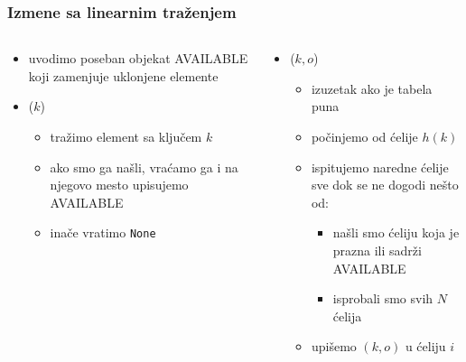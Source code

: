 \documentclass[compress]{beamer}
\begin{document}
\begin{frame}[fragile]
  \frametitle{Izmene sa linearnim traženjem}
  \begin{columns}
    \begin{column}[c]{6cm}
      \begin{itemize}
        \item uvodimo poseban objekat {\tiny AVAILABLE} koji zamenjuje uklonjene elemente
        \item {}($k$)
        \begin{itemize}
          \item tražimo element sa ključem $k$
          \item ako smo ga našli, vraćamo ga i na njegovo mesto upisujemo {\tiny AVAILABLE}
          \item inače vratimo \texttt{None}
        \end{itemize}
      \end{itemize}
    \end{column}
    \begin{column}[c]{6cm}
      \begin{itemize}
        \item {}($k, o$)
        \begin{itemize}
          \item izuzetak ako je tabela puna
          \item počinjemo od ćelije $h(k)$
          \item ispitujemo naredne ćelije sve dok se ne dogodi nešto od:
          \begin{itemize}
            \item našli smo ćeliju koja je prazna ili sadrži {\tiny AVAILABLE}
            \item isprobali smo svih $N$ ćelija
          \end{itemize}
          \item upišemo $(k, o)$ u ćeliju $i$
        \end{itemize}
      \end{itemize}
    \end{column}
  \end{columns}
\end{frame}
\end{document}
